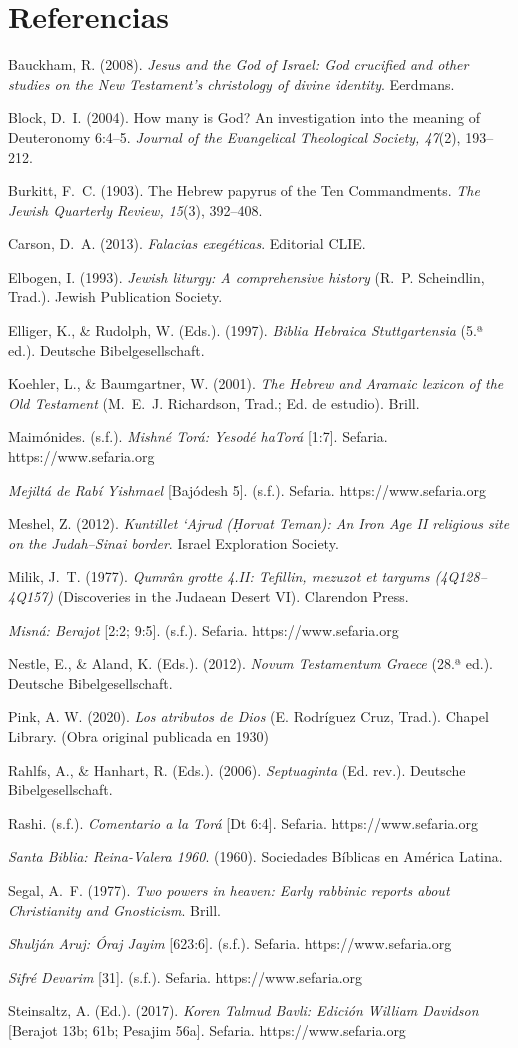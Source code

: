 \documentclass[11pt,letterpaper]{article}
\newcommand{\refapa}[1]{\par{\RaggedRight\hangindent=1.27cm\hangafter=1\noindent #1\par}\vspace{4pt}}
\begin{document}
\section*{Referencias}
\refapa{Bauckham, R. (2008). \emph{Jesus and the God of Israel: God crucified and other studies on the New Testament's christology of divine identity}. Eerdmans.}
\refapa{Block, D.~I. (2004). How many is God? An investigation into the meaning of Deuteronomy 6:4--5. \emph{Journal of the Evangelical Theological Society, 47}(2), 193--212.}
\refapa{Burkitt, F.~C. (1903). The Hebrew papyrus of the Ten Commandments. \emph{The Jewish Quarterly Review, 15}(3), 392--408.}
\refapa{Carson, D.~A. (2013). \emph{Falacias exegéticas}. Editorial CLIE.}
\refapa{Elbogen, I. (1993). \emph{Jewish liturgy: A comprehensive history} (R.~P. Scheindlin, Trad.). Jewish Publication Society.}
\refapa{Elliger, K., \& Rudolph, W. (Eds.). (1997). \emph{Biblia Hebraica Stuttgartensia} (5.ª ed.). Deutsche Bibelgesellschaft.}
\refapa{Koehler, L., \& Baumgartner, W. (2001). \emph{The Hebrew and Aramaic lexicon of the Old Testament} (M.~E.~J. Richardson, Trad.; Ed. de estudio). Brill.}
\refapa{Maimónides. (s.f.). \emph{Mishné Torá: Yesodé haTorá} [1:7]. Sefaria. https://www.sefaria.org}
\refapa{\emph{Mejiltá de Rabí Yishmael} [Bajódesh 5]. (s.f.). Sefaria. https://www.sefaria.org}
\refapa{Meshel, Z. (2012). \emph{Kuntillet `Ajrud (Ḥorvat Teman): An Iron Age II religious site on the Judah--Sinai border}. Israel Exploration Society.}
\refapa{Milik, J.~T. (1977). \emph{Qumrân grotte 4.II: Tefillin, mezuzot et targums (4Q128--4Q157)} (Discoveries in the Judaean Desert VI). Clarendon Press.}
\refapa{\emph{Misná: Berajot} [2:2; 9:5]. (s.f.). Sefaria. https://www.sefaria.org}
\refapa{Nestle, E., \& Aland, K. (Eds.). (2012). \emph{Novum Testamentum Graece} (28.ª ed.). Deutsche Bibelgesellschaft.}
\refapa{Pink, A. W. (2020). \emph{Los atributos de Dios} (E. Rodríguez Cruz, Trad.). Chapel Library. (Obra original publicada en 1930)}
\refapa{Rahlfs, A., \& Hanhart, R. (Eds.). (2006). \emph{Septuaginta} (Ed. rev.). Deutsche Bibelgesellschaft.}
\refapa{Rashi. (s.f.). \emph{Comentario a la Torá} [Dt 6:4]. Sefaria. https://www.sefaria.org}
\refapa{\emph{Santa Biblia: Reina-Valera 1960}. (1960). Sociedades Bíblicas en América Latina.}
\refapa{Segal, A.~F. (1977). \emph{Two powers in heaven: Early rabbinic reports about Christianity and Gnosticism}. Brill.}
\refapa{\emph{Shulján Aruj: Óraj Jayim} [623:6]. (s.f.). Sefaria. https://www.sefaria.org}
\refapa{\emph{Sifré Devarim} [31]. (s.f.). Sefaria. https://www.sefaria.org}
\refapa{Steinsaltz, A. (Ed.). (2017). \emph{Koren Talmud Bavli: Edición William Davidson} [Berajot 13b; 61b; Pesajim 56a]. Sefaria. https://www.sefaria.org}
\end{document}
